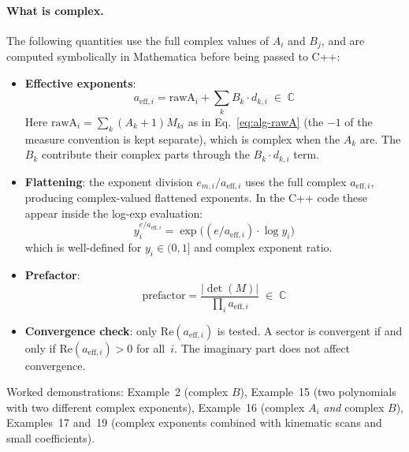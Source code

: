 \documentclass[11pt,a4paper]{article}
\begin{document}
\paragraph{What is complex.}
The following quantities use the full complex values of $A_i$ and $B_j$, and
are computed symbolically in Mathematica before being passed to C++:
\begin{itemize}
  \item \textbf{Effective exponents}:
    \begin{equation}
    a_{\mathrm{eff},i} = \mathrm{rawA}_i + \sum_k B_k \cdot d_{k,i} \;\in\; \mathbb{C}
    \end{equation}
    Here $\mathrm{rawA}_i = \sum_k (A_k + 1) M_{ki}$ as in Eq.~\eqref{eq:alg-rawA} (the $-1$ of the measure convention is kept separate), which is complex when the $A_k$ are.
    The $B_k$ contribute their complex parts through the $B_k \cdot d_{k,i}$ term.

  \item \textbf{Flattening}: the exponent division $e_{m,i} / a_{\mathrm{eff},i}$
    uses the full complex $a_{\mathrm{eff},i}$, producing complex-valued flattened exponents.
    In the C++ code these appear inside the log-exp evaluation:
    \begin{equation}
    y_i^{e/a_{\mathrm{eff},i}} = \exp\!\bigl((e/a_{\mathrm{eff},i}) \cdot \log y_i\bigr)
    \end{equation}
    which is well-defined for $y_i \in (0,1]$ and complex exponent ratio.

  \item \textbf{Prefactor}:
    \begin{equation}
    \mathrm{prefactor} = \frac{|\det(M)|}{\prod_i a_{\mathrm{eff},i}} \;\in\; \mathbb{C}
    \end{equation}

  \item \textbf{Convergence check}: only $\mathrm{Re}(a_{\mathrm{eff},i})$ is tested.
    A sector is convergent if and only if $\mathrm{Re}(a_{\mathrm{eff},i}) > 0$ for all~$i$.
    The imaginary part does not affect convergence.
\end{itemize}

Worked demonstrations: Example~2 (complex $B$), Example~15 (two polynomials with two different complex exponents), Example~16 (complex $A_i$ \emph{and} complex $B$), Examples~17 and~19 (complex exponents combined with kinematic scans and small coefficients).
\end{document}
